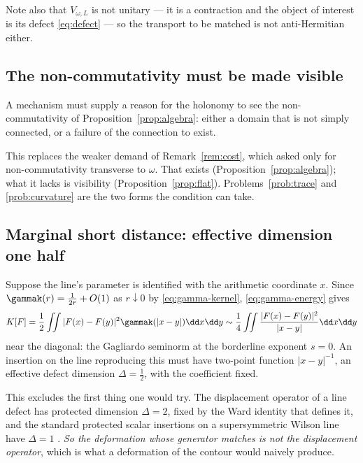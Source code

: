 Note also that $V_{\omega,L}$ is not unitary --- it is a contraction and the
object of interest is its defect \eqref{eq:defect} --- so the transport to be
matched is not anti-Hermitian either.

\subsection{The non-commutativity must be made visible}

\begin{condition}\label{cond:visible}
A mechanism must supply a reason for the holonomy to see the non-commutativity of
Proposition~\ref{prop:algebra}: either a domain that is not simply connected, or a
failure of the connection to exist.
\end{condition}

This replaces the weaker demand of Remark~\ref{rem:cost}, which asked only for
non-commutativity transverse to $\omega$. That exists
(Proposition~\ref{prop:algebra}); what it lacks is visibility
(Proposition~\ref{prop:flat}). Problems~\ref{prob:trace} and \ref{prob:curvature}
are the two forms the condition can take.

\subsection{Marginal short distance: effective dimension one half}

\begin{condition}[Marginality]\label{cond:marginal}
Suppose the line's parameter is identified with the arithmetic coordinate $x$.
Since $\gammak(r)=\frac1{2r}+O(1)$ as $r\downarrow0$ by \eqref{eq:gamma-kernel},
\eqref{eq:gamma-energy} gives
\[
 K[F]=\frac12\iint|F(x)-F(y)|^2\gammak(|x-y|)\dd x\dd y
 \sim\frac14\iint\frac{|F(x)-F(y)|^2}{|x-y|}\dd x\dd y
\]
near the diagonal: the Gagliardo seminorm at the borderline exponent $s=0$. An
insertion on the line reproducing this must have two-point function $|x-y|^{-1}$,
an effective defect dimension $\Delta=\frac12$, with the coefficient fixed.
\end{condition}

This excludes the first thing one would try. The displacement operator of a line
defect has protected dimension $\Delta=2$, fixed by the Ward identity that defines
it, and the standard protected scalar insertions on a supersymmetric Wilson line
have $\Delta=1$ \cite{GiombiKomatsu,CHMS}. \emph{So the deformation whose
generator matches is not the displacement operator}, which is what a deformation
of the contour would naively produce.

